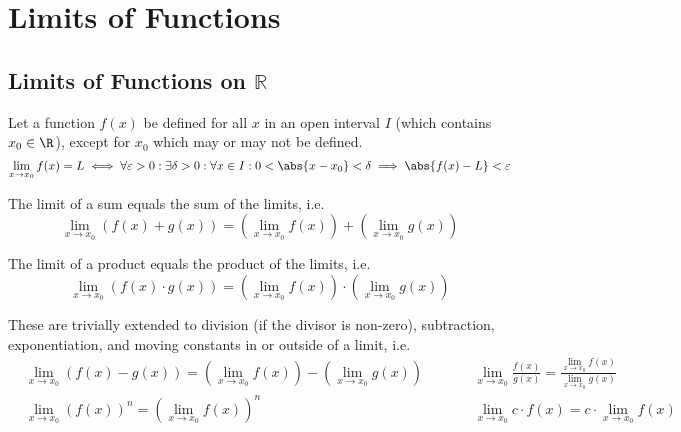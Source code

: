 \documentclass{article}
\begin{document}
\section{Limits of Functions}
\subsection{Limits of Functions on \texorpdfstring{$\mathbb{R}$}{the Reals}}
\begin{definition}
    Let a function $f(x)$ be defined for all $x$ in an open interval $I$
    (which contains $x_0 \in \R$), except for $x_0$ which may or may not be defined.
    \begin{equation*}
        \lim_{x\to x_0} f(x) = L \iff \forall\varepsilon>0: \exists\delta>0: \forall x \in I: 0<\abs{x-x_0}<\delta \implies \abs{f(x)-L}<\varepsilon
    \end{equation*}
\end{definition}
%
\begin{tcolorboxlarge}[title={Limit Laws for Functions}]
    \begin{theorem} The limit of a sum equals the sum of the limits, i.e.
        \begin{equation*}
            \lim_{x\to x_0}\left(f(x)+g(x)\right)
            = \left(\lim_{x\to x_0}f(x)\right) + \left(\lim_{x\to x_0}g(x)\right)
        \end{equation*}
    \end{theorem}
    \begin{theorem} The limit of a product equals the product of the limits, i.e.
        \begin{equation*}
            \lim_{x\to x_0}\left(f(x)\cdot g(x)\right)
            = \left(\lim_{x\to x_0}f(x)\right) \cdot \left(\lim_{x\to x_0}g(x)\right)
        \end{equation*}
    \end{theorem}
    These are trivially extended to
    division (if the divisor is non-zero),
    subtraction, exponentiation, and moving constants in or outside of a limit, i.e.
    \begin{align*}
            & \lim_{x\to x_0}\left(f(x) - g(x)\right)
        = \left(\lim_{x\to x_0}f(x)\right) - \left(\lim_{x\to x_0}g(x)\right)
            & \qquad
            & \lim_{x\to x_0}\frac{f(x)}{g(x)}
        = \frac{\lim_{x\to x_0}f(x)}{\lim_{x\to x_0}g(x)}
        \\
            & \lim_{x\to x_0}\left(f(x)\right)^n
        = \left(\lim_{x\to x_0}f(x)\right)^n
            & \qquad
            & \lim_{x\to x_0} c \cdot f(x)
        = c \cdot \lim_{x\to x_0}f(x)
    \end{align*}
\end{tcolorboxlarge}
\end{document}

